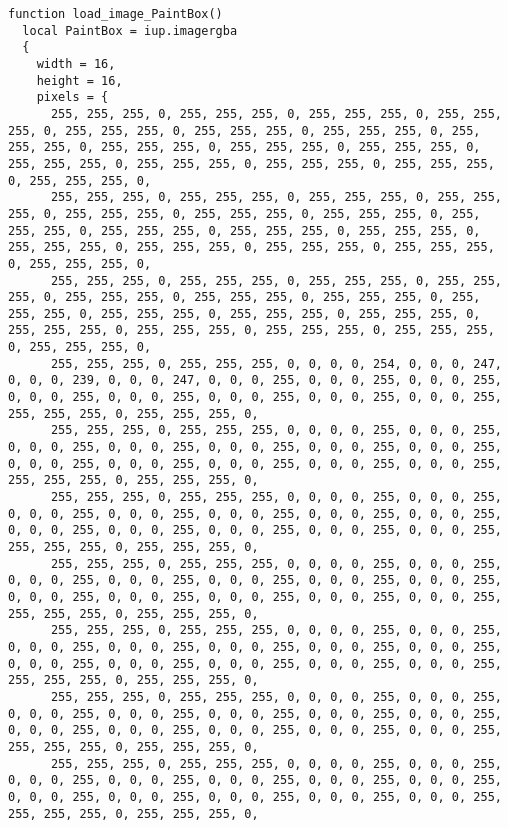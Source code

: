 \documentclass{ctexart}
\begin{document}
\begin{lstlisting}
function load_image_PaintBox()
  local PaintBox = iup.imagergba
  {
    width = 16,
    height = 16,
    pixels = {
      255, 255, 255, 0, 255, 255, 255, 0, 255, 255, 255, 0, 255, 255, 255, 0, 255, 255, 255, 0, 255, 255, 255, 0, 255, 255, 255, 0, 255, 255, 255, 0, 255, 255, 255, 0, 255, 255, 255, 0, 255, 255, 255, 0, 255, 255, 255, 0, 255, 255, 255, 0, 255, 255, 255, 0, 255, 255, 255, 0, 255, 255, 255, 0, 
      255, 255, 255, 0, 255, 255, 255, 0, 255, 255, 255, 0, 255, 255, 255, 0, 255, 255, 255, 0, 255, 255, 255, 0, 255, 255, 255, 0, 255, 255, 255, 0, 255, 255, 255, 0, 255, 255, 255, 0, 255, 255, 255, 0, 255, 255, 255, 0, 255, 255, 255, 0, 255, 255, 255, 0, 255, 255, 255, 0, 255, 255, 255, 0, 
      255, 255, 255, 0, 255, 255, 255, 0, 255, 255, 255, 0, 255, 255, 255, 0, 255, 255, 255, 0, 255, 255, 255, 0, 255, 255, 255, 0, 255, 255, 255, 0, 255, 255, 255, 0, 255, 255, 255, 0, 255, 255, 255, 0, 255, 255, 255, 0, 255, 255, 255, 0, 255, 255, 255, 0, 255, 255, 255, 0, 255, 255, 255, 0, 
      255, 255, 255, 0, 255, 255, 255, 0, 0, 0, 0, 254, 0, 0, 0, 247, 0, 0, 0, 239, 0, 0, 0, 247, 0, 0, 0, 255, 0, 0, 0, 255, 0, 0, 0, 255, 0, 0, 0, 255, 0, 0, 0, 255, 0, 0, 0, 255, 0, 0, 0, 255, 0, 0, 0, 255, 255, 255, 255, 0, 255, 255, 255, 0, 
      255, 255, 255, 0, 255, 255, 255, 0, 0, 0, 0, 255, 0, 0, 0, 255, 0, 0, 0, 255, 0, 0, 0, 255, 0, 0, 0, 255, 0, 0, 0, 255, 0, 0, 0, 255, 0, 0, 0, 255, 0, 0, 0, 255, 0, 0, 0, 255, 0, 0, 0, 255, 0, 0, 0, 255, 255, 255, 255, 0, 255, 255, 255, 0, 
      255, 255, 255, 0, 255, 255, 255, 0, 0, 0, 0, 255, 0, 0, 0, 255, 0, 0, 0, 255, 0, 0, 0, 255, 0, 0, 0, 255, 0, 0, 0, 255, 0, 0, 0, 255, 0, 0, 0, 255, 0, 0, 0, 255, 0, 0, 0, 255, 0, 0, 0, 255, 0, 0, 0, 255, 255, 255, 255, 0, 255, 255, 255, 0, 
      255, 255, 255, 0, 255, 255, 255, 0, 0, 0, 0, 255, 0, 0, 0, 255, 0, 0, 0, 255, 0, 0, 0, 255, 0, 0, 0, 255, 0, 0, 0, 255, 0, 0, 0, 255, 0, 0, 0, 255, 0, 0, 0, 255, 0, 0, 0, 255, 0, 0, 0, 255, 0, 0, 0, 255, 255, 255, 255, 0, 255, 255, 255, 0, 
      255, 255, 255, 0, 255, 255, 255, 0, 0, 0, 0, 255, 0, 0, 0, 255, 0, 0, 0, 255, 0, 0, 0, 255, 0, 0, 0, 255, 0, 0, 0, 255, 0, 0, 0, 255, 0, 0, 0, 255, 0, 0, 0, 255, 0, 0, 0, 255, 0, 0, 0, 255, 0, 0, 0, 255, 255, 255, 255, 0, 255, 255, 255, 0, 
      255, 255, 255, 0, 255, 255, 255, 0, 0, 0, 0, 255, 0, 0, 0, 255, 0, 0, 0, 255, 0, 0, 0, 255, 0, 0, 0, 255, 0, 0, 0, 255, 0, 0, 0, 255, 0, 0, 0, 255, 0, 0, 0, 255, 0, 0, 0, 255, 0, 0, 0, 255, 0, 0, 0, 255, 255, 255, 255, 0, 255, 255, 255, 0, 
      255, 255, 255, 0, 255, 255, 255, 0, 0, 0, 0, 255, 0, 0, 0, 255, 0, 0, 0, 255, 0, 0, 0, 255, 0, 0, 0, 255, 0, 0, 0, 255, 0, 0, 0, 255, 0, 0, 0, 255, 0, 0, 0, 255, 0, 0, 0, 255, 0, 0, 0, 255, 0, 0, 0, 255, 255, 255, 255, 0, 255, 255, 255, 0, 

\end{lstlisting}
\end{document}
